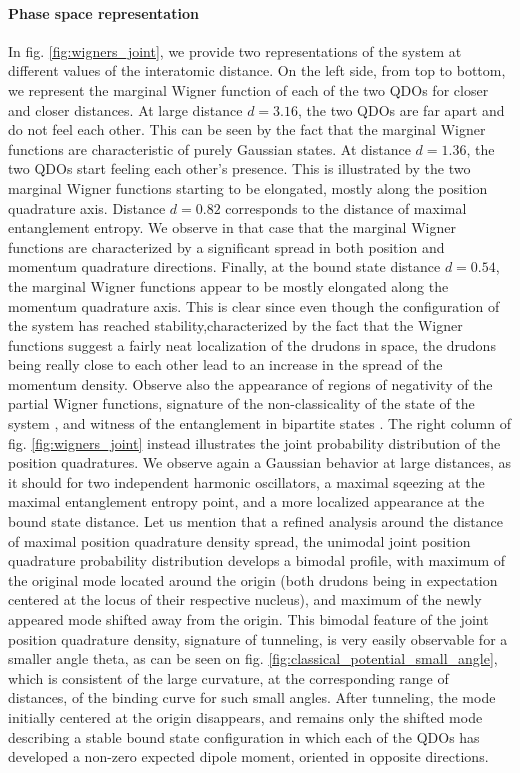 \documentclass[reprint, amsmath, amssymb, floatfix, aps, pra]{revtex4-2}
\begin{document}
    \paragraph*{Phase space representation}
    In fig. \ref{fig:wigners_joint}, we provide two representations of the system at different values of the interatomic distance. On the left side, from top to bottom, we represent the marginal Wigner function of each of the two QDOs for closer and closer distances. At large distance $d=3.16$, the two QDOs are far apart and do not feel each other. This can be seen by the fact that the marginal Wigner functions are characteristic of purely Gaussian states. At distance $d=1.36$, the two QDOs start feeling each other's presence. This is illustrated by the two marginal Wigner functions starting to be elongated, mostly along the position quadrature axis. Distance $d=0.82$ corresponds to the distance of maximal entanglement entropy. We observe in that case that the marginal Wigner functions are characterized by a significant spread in both position and momentum quadrature directions. Finally, at the bound state distance $d=0.54$, the marginal Wigner functions appear to be mostly elongated along the momentum quadrature axis. This is clear since even though the configuration of the system has reached stability,characterized by the fact that the Wigner functions suggest a fairly neat localization of the drudons in space, the drudons being really close to each other lead to an increase in the spread of the momentum density. Observe also the appearance of regions of negativity of the partial Wigner functions, signature of the non-classicality of the state of the system \cite{Chabaud:2021pnh}, and witness of the entanglement in bipartite states \cite{arkhipov2018negativity}. The right column of fig. \ref{fig:wigners_joint} instead illustrates the joint probability distribution of the position quadratures. We observe again a Gaussian behavior at large distances, as it should for two independent harmonic oscillators, a maximal sqeezing at the maximal entanglement entropy point, and a more localized appearance at the bound state distance. Let us mention that a refined analysis around the distance of maximal position quadrature density spread, the unimodal joint position quadrature probability distribution develops a bimodal profile, with maximum of the original mode located around the origin (both drudons being in expectation centered at the locus of their respective nucleus), and maximum of the newly appeared mode shifted away from the origin. This bimodal feature of the joint position quadrature density, signature of tunneling, is very easily observable for a smaller angle theta, as can be seen on fig. \ref{fig:classical_potential_small_angle}, which is consistent of the large curvature, at the corresponding range of distances, of the binding curve for such small angles. After tunneling, the mode initially centered at the origin disappears, and remains only the shifted mode describing a stable bound state configuration in which each of the QDOs has developed a non-zero expected dipole moment, oriented in opposite directions.
    \newline
\end{document}
